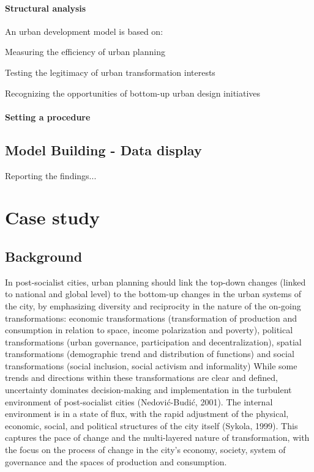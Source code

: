 \documentclass[11pt]{report}
\begin{document}
\subsubsection{Structural analysis}

An urban development model is based on:

Measuring the efficiency of urban planning

Testing the legitimacy of urban transformation interests

Recognizing the opportunities of bottom-up urban design initiatives


\subsubsection{Setting a procedure}

\section{Model Building - Data display}

Reporting the findings...


\chapter{Case study}


\section{Background}
In post-socialist cities, urban planning should link the top-down changes (linked to national and global level) to the bottom-up changes in the urban systems of the city, by emphasizing diversity and reciprocity in the nature of the on-going transformations: economic transformations (transformation of production and consumption in relation to space, income polarization and poverty), political transformations (urban governance, participation and decentralization), spatial transformations (demographic trend and distribution of functions) and social transformations (social inclusion, social activism and informality)
While some trends and directions within these transformations are clear and defined, uncertainty dominates decision-making and implementation in the turbulent environment of post-socialist cities (Nedović-Budić, 2001). The internal environment is in a state of flux, with the rapid adjustment of the physical, economic, social, and political structures of the city itself (Sykola, 1999). This captures the pace of change and the multi-layered nature of transformation, with the focus on the process of change in the city’s economy, society, system of governance and the spaces of production and consumption.
\end{document}
